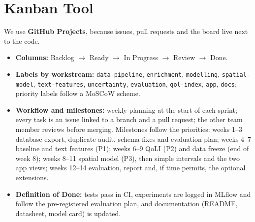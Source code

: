 \documentclass[11pt,a4paper]{article}
\begin{document}
\section{Kanban Tool}
We use \textbf{GitHub Projects}, because issues, pull requests and the board live next to the code.
\begin{itemize}
    \item \textbf{Columns:} Backlog $\rightarrow$ Ready $\rightarrow$ In Progress $\rightarrow$ Review $\rightarrow$ Done.
    \item \textbf{Labels by workstream:} \texttt{data-pipeline}, \texttt{enrichment}, \texttt{modelling}, \texttt{spatial-model}, \texttt{text-features}, \texttt{uncertainty}, \texttt{evaluation}, \texttt{qol-index}, \texttt{app}, \texttt{docs}; priority labels follow a MoSCoW scheme.
    \item \textbf{Workflow and milestones:} weekly planning at the start of each sprint; every task is an issue linked to a branch and a pull request; the other team member reviews before merging. Milestones follow the priorities: weeks 1--3 database export, duplicate audit, schema fixes and evaluation plan; weeks 4--7 baseline and text features (P1); weeks 6--9 QoLI (P2) and data freeze (end of week 8); weeks 8--11 spatial model (P3), then simple intervals and the two app views; weeks 12--14 evaluation, report and, if time permits, the optional extensions.
    \item \textbf{Definition of Done:} tests pass in CI, experiments are logged in MLflow and follow the pre-registered evaluation plan, and documentation (README, datasheet, model card) is updated.
\end{itemize}

\end{document}
